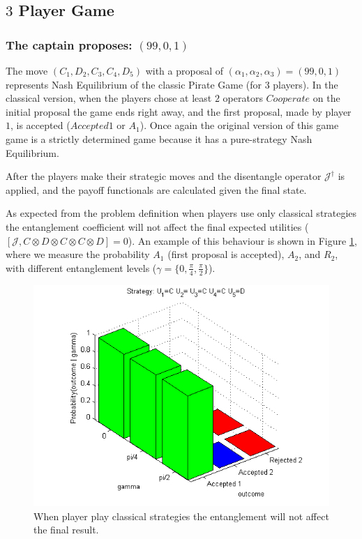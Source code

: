 \documentclass[10pt]{llncs}
\begin{document}
\subsection{$3$ Player Game}
\label{subsec:3playergame}


\subsubsection{The captain proposes: $(99, 0, 1)$}
\label{subsubsec:3playergame99}

The move $(C_1,D_2,C_3,C_4,D_5)$ with a proposal of $(\alpha_{1}, \alpha_{2}, \alpha_{3}) =(99, 0, 1)$ represents Nash Equilibrium of the classic Pirate Game (for $3$ players). In the classical version, when the players chose at least $2$ operators $Cooperate$ on the initial proposal the game ends right away, and the first proposal, made by player $1$, is accepted ($Accepted 1$ or $A_{1}$). Once again the original version of this game game is a strictly determined game because it has a pure-strategy Nash Equilibrium.

After the players make their strategic moves and the disentangle operator $\mathcal{J}^{\dagger}$ is applied, and the payoff functionals are calculated given the final state. 

As expected from the problem definition when players use only classical strategies the entanglement coefficient will not affect the final expected utilities ($[ \mathcal{J} , C \otimes D \otimes C \otimes C \otimes D ] = 0 $).
An example of this behaviour is shown in Figure \ref{fig:pg_3players_99_0_1}, where we measure the probability $A_{1}$ (first proposal is accepted), $A_{2}$, and $R_{2}$, with different entanglement levels ($\gamma= \{ 0 , \frac{ \pi}{4}, \frac{\pi}{2} \} $).

\begin{figure}[h!]
\centering 
\includegraphics[scale=0.50]{Figures/1.5qubit/CDCCD.png}
\caption{When player play classical strategies the entanglement will not affect the final result. }
\label{fig:pg_3players_99_0_1}
\end{figure}
\end{document}
